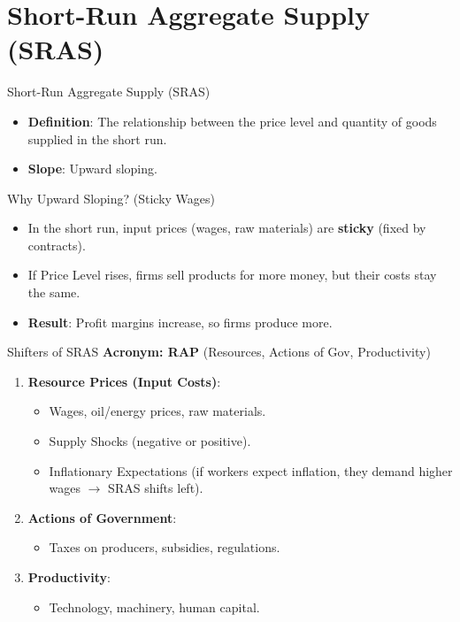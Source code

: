 \documentclass{beamer}
\begin{document}
\section{Short-Run Aggregate Supply (SRAS)}

\begin{frame}{Short-Run Aggregate Supply (SRAS)}
    \begin{itemize}
        \item \textbf{Definition}: The relationship between the price level and quantity of goods supplied in the short run.
        \item \textbf{Slope}: Upward sloping.
    \end{itemize}
    \begin{block}{Why Upward Sloping? (Sticky Wages)}
        \begin{itemize}
            \item In the short run, input prices (wages, raw materials) are \textbf{sticky} (fixed by contracts).
            \item If Price Level rises, firms sell products for more money, but their costs stay the same.
            \item \textbf{Result}: Profit margins increase, so firms produce more.
        \end{itemize}
    \end{block}
\end{frame}

\begin{frame}{Shifters of SRAS}
    \textbf{Acronym: RAP} (Resources, Actions of Gov, Productivity)
    \begin{enumerate}
        \item \textbf{Resource Prices (Input Costs)}: 
        \begin{itemize}
            \item Wages, oil/energy prices, raw materials.
            \item Supply Shocks (negative or positive).
            \item Inflationary Expectations (if workers expect inflation, they demand higher wages $\rightarrow$ SRAS shifts left).
        \end{itemize}
        \item \textbf{Actions of Government}:
        \begin{itemize}
            \item Taxes on producers, subsidies, regulations.
        \end{itemize}
        \item \textbf{Productivity}:
        \begin{itemize}
            \item Technology, machinery, human capital.
        \end{itemize}
    \end{enumerate}
\end{frame}
\end{document}
